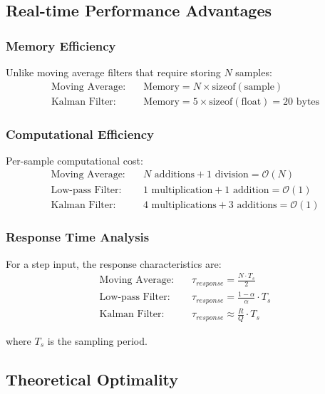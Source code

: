 \documentclass{article}
\begin{document}
\subsection{Real-time Performance Advantages}

\subsubsection{Memory Efficiency}

Unlike moving average filters that require storing $N$ samples:
\begin{align}
\text{Moving Average:} \quad &\text{Memory} = N \times \text{sizeof}(\text{sample}) \\
\text{Kalman Filter:} \quad &\text{Memory} = 5 \times \text{sizeof}(\text{float}) = 20 \text{ bytes}
\end{align}

\subsubsection{Computational Efficiency}

Per-sample computational cost:
\begin{align}
\text{Moving Average:} \quad &N \text{ additions} + 1 \text{ division} = \mathcal{O}(N) \\
\text{Low-pass Filter:} \quad &1 \text{ multiplication} + 1 \text{ addition} = \mathcal{O}(1) \\
\text{Kalman Filter:} \quad &4 \text{ multiplications} + 3 \text{ additions} = \mathcal{O}(1)
\end{align}

\subsubsection{Response Time Analysis}

For a step input, the response characteristics are:
\begin{align}
\text{Moving Average:} \quad &\tau_{response} = \frac{N \cdot T_s}{2} \\
\text{Low-pass Filter:} \quad &\tau_{response} = \frac{1-\alpha}{\alpha} \cdot T_s \\
\text{Kalman Filter:} \quad &\tau_{response} \approx \frac{R}{Q} \cdot T_s
\end{align}

where $T_s$ is the sampling period.

\subsection{Theoretical Optimality}
\end{document}
